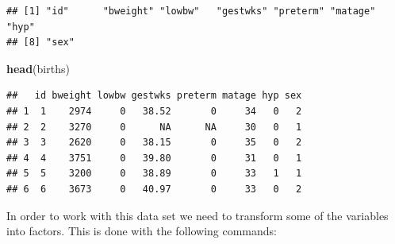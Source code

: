 \documentclass[
]{book}
\newenvironment{Shaded}{\begin{snugshade}}{\end{snugshade}}
\newcommand{\AttributeTok}[1]{\textcolor[rgb]{0.13,0.29,0.53}{#1}}
\newcommand{\ConstantTok}[1]{\textcolor[rgb]{0.56,0.35,0.01}{#1}}
\newcommand{\DecValTok}[1]{\textcolor[rgb]{0.00,0.00,0.81}{#1}}
\newcommand{\FunctionTok}[1]{\textcolor[rgb]{0.13,0.29,0.53}{\textbf{#1}}}
\newcommand{\NormalTok}[1]{#1}
\newcommand{\OtherTok}[1]{\textcolor[rgb]{0.56,0.35,0.01}{#1}}
\newcommand{\SpecialCharTok}[1]{\textcolor[rgb]{0.81,0.36,0.00}{\textbf{#1}}}
\newcommand{\StringTok}[1]{\textcolor[rgb]{0.31,0.60,0.02}{#1}}
\theoremstyle{definition}
\theoremstyle{definition}
\theoremstyle{definition}
\theoremstyle{definition}
\theoremstyle{remark}
\begin{document}
\begin{verbatim}
## [1] "id"      "bweight" "lowbw"   "gestwks" "preterm" "matage"  "hyp"    
## [8] "sex"
\end{verbatim}

\begin{Shaded}
\begin{Highlighting}[]
\FunctionTok{head}\NormalTok{(births)}
\end{Highlighting}
\end{Shaded}

\begin{verbatim}
##   id bweight lowbw gestwks preterm matage hyp sex
## 1  1    2974     0   38.52       0     34   0   2
## 2  2    3270     0      NA      NA     30   0   1
## 3  3    2620     0   38.15       0     35   0   2
## 4  4    3751     0   39.80       0     31   0   1
## 5  5    3200     0   38.89       0     33   1   1
## 6  6    3673     0   40.97       0     33   0   2
\end{verbatim}

In order to work with this data set we need to transform some of the variables
into factors. This is done with the following commands:

\begin{Shaded}
\end{Shaded}
\end{document}
